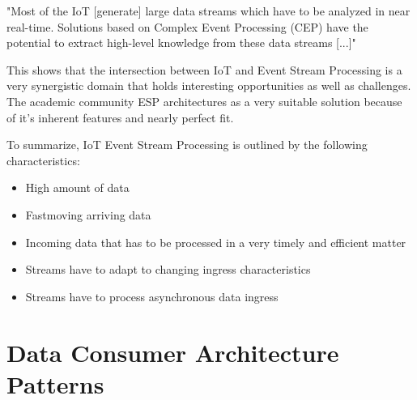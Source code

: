 \begin{enumerate}
    \begin{displayquote}
        "Most of the IoT [generate] large data streams which have to be analyzed
        in near real-time. Solutions based on Complex Event Processing
        (CEP) have the potential to extract high-level knowledge from
        these data streams [...]"\autocite{Akbar2016Context-awareApplications}
    \end{displayquote}
    
    This shows that the intersection between IoT and Event Stream Processing is a very synergistic domain that holds interesting opportunities as well as challenges. The academic community \ac{ESP} architectures as a very suitable solution because of it's inherent features and nearly perfect fit. 
    
    To summarize, IoT Event Stream Processing is outlined by the following characteristics:
    
    \begin{itemize}[nolistsep]
        \item High amount of data
        \item Fastmoving arriving data 
        \item Incoming data that has to be processed in a very timely and efficient matter
        \item Streams have to adapt to changing ingress characteristics
        \item Streams have to process asynchronous data ingress
    \end{itemize}
    
    
\end{enumerate}


\section{Data Consumer Architecture Patterns}

